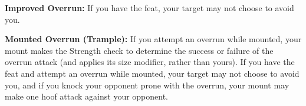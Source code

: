\textbf{Improved Overrun:} If you have the  feat, your target may not choose to avoid you.

\textbf{Mounted Overrun (Trample):} If you attempt an overrun while mounted, your mount makes the Strength check to determine the success or failure of the overrun attack (and applies its size modifier, rather than yours). If you have the  feat and attempt an overrun while mounted, your target may not choose to avoid you, and if you knock your opponent prone with the overrun, your mount may make one hoof attack against your opponent.